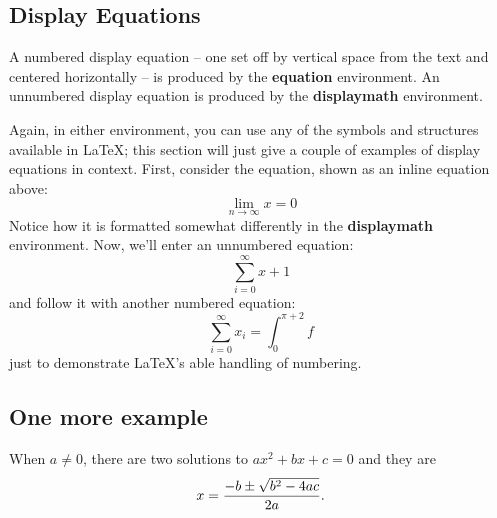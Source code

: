 \documentclass[review]{styles/stucosrec_article}
\begin{document}
	\subsection{Display Equations}
	A numbered display equation -- one set off by vertical space
	from the text and centered horizontally -- is produced
	by the \textbf{equation} environment. An unnumbered display
	equation is produced by the \textbf{displaymath} environment.
	
	Again, in either environment, you can use any of the symbols
	and structures available in \LaTeX; this section will just
	give a couple of examples of display equations in context.
	First, consider the equation, shown as an inline equation above:
	\begin{equation}\lim_{n\rightarrow \infty}x=0\end{equation}
	Notice how it is formatted somewhat differently in
	the \textbf{displaymath}
	environment.  Now, we'll enter an unnumbered equation:
	\begin{displaymath}\sum_{i=0}^{\infty} x + 1\end{displaymath}
	and follow it with another numbered equation:
	\begin{equation}\sum_{i=0}^{\infty}x_i=\int_{0}^{\pi+2} f\end{equation}
	just to demonstrate \LaTeX's able handling of numbering.
	
	\subsection{One more example}
	When $a \ne 0$, there are two solutions to $ax^2 + bx + c = 0$ and they are
	$$x = {-b \pm \sqrt{b^2-4ac} \over 2a}.$$
	
	
\end{document}
